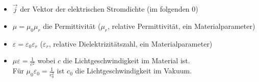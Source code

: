 \documentclass[a4paper,12pt]{article}
\begin{document}
\begin{task}{}
\begin{itemize}
  \begin{itemize}
    \item $\vec{j}$ der Vektor der elektrischen Stromdichte (im folgenden $0$)
    \item $\mu = \mu_0 \mu_r$ die Permittivität ($\mu_r$, relative Permittivität, ein Materialparameter)
    \item $\varepsilon = \varepsilon_0 \varepsilon_r$ ($\varepsilon_r$, relative Dielektrizitätszahl, ein Materialparameter)
    \item $\mu \varepsilon = \frac{1}{c^2}$ wobei $c$ die Lichtgeschwindigkeit im Material ist. \\ Für $\mu_0 \varepsilon_0 = \frac{1}{c_0^2}$ ist $c_0$ die Lichtgeschwindigkeit im Vakuum.
  \end{itemize}
\end{itemize}


\end{task}
\end{document}
